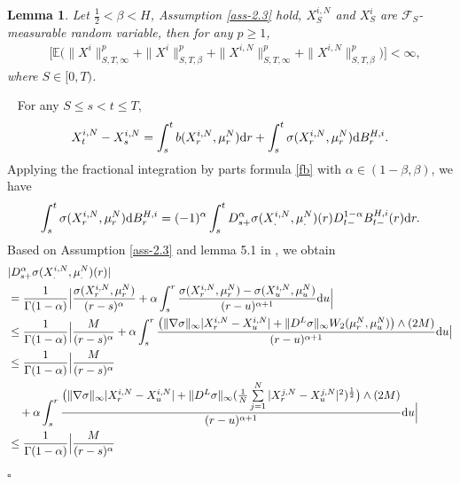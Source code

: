 \documentclass[12pt]{article}
\newtheorem{lemma}[theorem]{Lemma}
\def\F{\mathscr F}
\def\d{\text{\rm{d}}}
\def\E{\mathbb E}
\newenvironment{proof}{{\noindent\it Proof.}\ }{\hfill $\square$\par}
\numberwithin{equation}{section}
\begin{document}
	\begin{lemma}\label{lem-3.2}
		Let $\frac{1}{2}<\beta<H$, Assumption \ref{ass-2.3} hold, $X^{i,N}_S$ and $X^i_S$ are $\F_S$-measurable random variable, then for any $p\geq 1$,
		\begin{equation}
			\begin{aligned}
				&\Big[\E\Big(\|X^i\|^p_{S,T,\infty}+\|X^i\|^p_{S,T,\beta}+\|X^{i,N}\|^p_{S,T,\infty}+\|X^{i,N}\|^p_{S,T,\beta}\Big)\Big]< \infty,
			\end{aligned}
		\end{equation}
		where $S\in [0,T)$.
	\end{lemma}
	\begin{proof}
		For any $S\leq s < t \leq T$,
		\begin{equation}
			X_t^{i,N}-X_s^{i,N}=\int_{s}^{t}b(X_r^{i,N},\mu_r^N)\d r+\int_{s}^{t}\sigma(X_r^{i,N},\mu_r^N)\d B^{H,i}_r.
		\end{equation}
		Applying the fractional integration by parts formula \eqref{fb} with $\alpha\in(1-\beta,\beta)$, we have
		\begin{equation}\label{eq4.6}
			\int_{s}^{t}\sigma(X_r^{i,N},\mu_r^N)\d B^{H,i}_r=(-1)^{\alpha}\int_{s}^{t}D^{\alpha}_{s+}\sigma(X_{.}^{i,N},\mu_{.}^N)(r)D^{1-\alpha}_{t-}B_{t-}^{H,i}(r)\d r.
		\end{equation}
		Based on Assumption \ref{ass-2.3} and lemma 5.1 in \cite{fan}, we obtain
		\begin{equation}\label{eq4.7}
			\begin{aligned}
				&|D^{\alpha}_{s+}\sigma(X_{.}^{i,N},\mu_{.}^N)(r)|\\
				&= \frac{1}{\Gamma(1-\alpha)}\Big|\frac{\sigma(X^{i,N}_r,\mu_r^N)}{(r-s)^{\alpha}}+\alpha\int_{s}^{r}\frac{\sigma(X^{i,N}_r,\mu_r^N)-\sigma(X^{i,N}_u,\mu_u^N)}{(r-u)^{\alpha+1}}\d u\Big|\\
				&\leq \frac{1}{\Gamma(1-\alpha)}\Big|\frac{M}{(r-s)^{\alpha}}+\alpha\int_{s}^{r}
				\frac{\big(\|\nabla\sigma\|_{\infty}|X^{i,N}_r-X^{i,N}_u|+\|D^L\sigma\|_{\infty}W_2(\mu_r^N,\mu_u^N)\big)\wedge (2M)}{(r-u)^{\alpha+1}}\d u\big|\\
				&\leq \frac{1}{\Gamma(1-\alpha)}\Big|\frac{M}{(r-s)^{\alpha}}\\
				&\quad+\alpha\int_{s}^{r}
				\frac{\big(\|\nabla\sigma\|_{\infty}|X^{i,N}_r-X^{i,N}_u|+\|D^L\sigma\|_{\infty}(\frac{1}{N}\sum\limits_{j=1}^{N}|X^{j,N}_r-X^{j,N}_u|^2)^{\frac{1}{2}}\big)\wedge (2M)}{(r-u)^{\alpha+1}}\d u\Big|\\
				&\leq \frac{1}{\Gamma(1-\alpha)}\Big|\frac{M}{(r-s)^{\alpha}}\\

\end{aligned}
\end{equation}
\end{proof}
\end{document}
